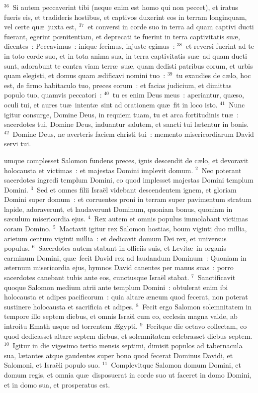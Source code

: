 ${}^{36}$~Si autem peccaverint tibi (neque enim est homo qui non peccet), et iratus fueris eis, et tradideris hostibus, et captivos duxerint eos in terram longinquam, vel certe qu\ae\ juxta est,
${}^{37}$~et conversi in corde suo in terra ad quam captivi ducti fuerant, egerint pœnitentiam, et deprecati te fuerint in terra captivitatis su\ae , dicentes~: Peccavimus~: inique fecimus, injuste egimus~:
${}^{38}$~et reversi fuerint ad te in toto corde suo, et in tota anima sua, in terra captivitatis su\ae\ ad quam ducti sunt, adorabunt te contra viam terr\ae\ su\ae , quam dedisti patribus eorum, et urbis quam elegisti, et domus quam \ae dificavi nomini tuo~:
${}^{39}$~tu exaudies de c\ae lo, hoc est, de firmo habitaculo tuo, preces eorum~: et facias judicium, et dimittas populo tuo, quamvis peccatori~:
${}^{40}$~tu es enim Deus meus~: aperiantur, qu\ae so, oculi tui, et aures tu\ae\ intent\ae\ sint ad orationem qu\ae\ fit in loco isto.
${}^{41}$~Nunc igitur consurge, Domine Deus, in requiem tuam, tu et arca fortitudinis tu\ae~: sacerdotes tui, Domine Deus, induantur salutem, et sancti tui l\ae tentur in bonis.
${}^{42}$~Domine Deus, ne averteris faciem christi tui~: memento misericordiarum David servi tui.

\bchapter
{}umque complesset Salomon fundens preces, ignis descendit de c\ae lo, et devoravit holocausta et victimas~: et majestas Domini implevit domum.
${}^{2}$~Nec poterant sacerdotes ingredi templum Domini, eo quod implesset majestas Domini templum Domini.
${}^{3}$~Sed et omnes filii Isra\"el videbant descendentem ignem, et gloriam Domini super domum~: et corruentes proni in terram super pavimentum stratum lapide, adoraverunt, et laudaverunt Dominum, quoniam bonus, quoniam in s\ae culum misericordia ejus.
${}^{4}$~Rex autem et omnis populus immolabant victimas coram Domino.
${}^{5}$~Mactavit igitur rex Salomon hostias, boum viginti duo millia, arietum centum viginti millia~: et dedicavit domum Dei rex, et universus populus.
${}^{6}$~Sacerdotes autem stabant in officiis suis, et Levit\ae\ in organis carminum Domini, qu\ae\ fecit David rex ad laudandum Dominum~: Quoniam in \ae ternum misericordia ejus, hymnos David canentes per manus suas~: porro sacerdotes canebant tubis ante eos, cunctusque Isra\"el stabat.
${}^{7}$~Sanctificavit quoque Salomon medium atrii ante templum Domini~: obtulerat enim ibi holocausta et adipes pacificorum~: quia altare \ae neum quod fecerat, non poterat sustinere holocausta et sacrificia et adipes.
${}^{8}$~Fecit ergo Salomon solemnitatem in tempore illo septem diebus, et omnis Isra\"el cum eo, ecclesia magna valde, ab introitu Emath usque ad torrentem \AE gypti.
${}^{9}$~Fecitque die octavo collectam, eo quod dedicasset altare septem diebus, et solemnitatem celebrasset diebus septem.
${}^{10}$~Igitur in die vigesimo tertio mensis septimi, dimisit populos ad tabernacula sua, l\ae tantes atque gaudentes super bono quod fecerat Dominus Davidi, et Salomoni, et Isra\"eli populo suo.
${}^{11}$~Complevitque Salomon domum Domini, et domum regis, et omnia qu\ae\ disposuerat in corde suo ut faceret in domo Domini, et in domo sua, et prosperatus est.


